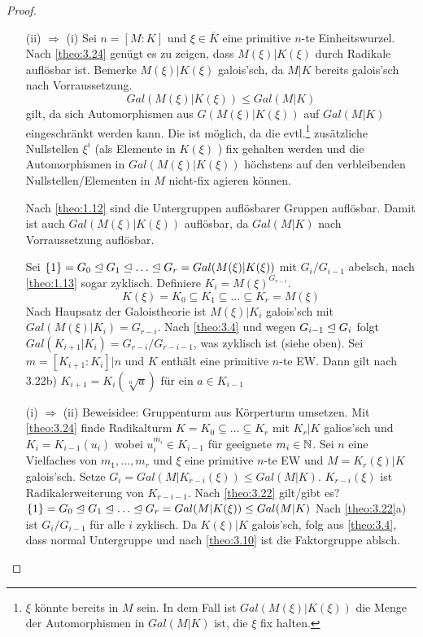\documentclass[../main.tex]{subfiles}
\begin{document}
\begin{proof} $ $
    \begin{itemize}
        \item[(ii) $\Rightarrow$ (i)]
        Sei $n=[M:K]$ und $\xi\in\overline{K}$ eine primitive $n$-te Einheitswurzel.
        Nach \ref{theo:3.24} genügt es zu zeigen, dass $M(\xi)|K(\xi)$ durch Radikale auflösbar ist.
        Bemerke $M(\xi)|K(\xi)$ galois'sch, da $M|K$ bereits galois'sch nach Vorraussetzung.
        $$Gal(M(\xi)|K(\xi)) \leq Gal(M|K)$$
        gilt, da sich Automorphismen aus $G(M(\xi)|K(\xi))$ auf $Gal(M|K)$ eingeschränkt werden kann.
        Die ist möglich, da die evtl.\footnote{$\xi$ könnte bereits in $M$ sein. In dem Fall ist $Gal(M(\xi)|K(\xi))$ die Menge der Automorphismen in $Gal(M|K)$ ist, die $\xi$ fix halten.} zusätzliche Nullstellen $\xi^i$ (als Elemente in $K(\xi)$ ) fix gehalten werden und die Automorphismen in $Gal(M(\xi)|K(\xi))$ höchstens auf den verbleibenden Nullstellen/Elementen in $M$ nicht-fix agieren können.
        
        Nach \cref{theo:1.12} sind die Untergruppen auflösbarer Gruppen auflösbar. Damit ist auch $Gal(M(\xi)|K(\xi))$ auflösbar, da $Gal(M|K)$ nach Vorraussetzung auflösbar.

        Sei $\trivGO = G_0\nteq G_1\nteq \dots\nteq G_r = Gal(M(\xi)|K(\xi))$ mit $G_i/G_{i-1}$ abelsch, nach \ref{theo:1.13} sogar zyklisch.
        Definiere $K_i=M(\xi)^{G_{r-i}}$.
        $$K(\xi) = K_0\subseteq K_1\subseteq \dots\subseteq K_r = M(\xi)$$
        Nach Haupsatz der Galoistheorie ist $M(\xi)|K_i$ galois'sch mit $Gal(M(\xi)|K_i) = G_{r-i}$.
        Nach \ref{theo:3.4} und wegen $G_{i-1}\trianglelefteq G_i$ folgt $Gal(K_{i+1}|K_i) = G_{r-i}/G_{r-i-1}$, was zyklisch ist (siehe oben).
        Sei $m=[K_{i+1}:K_i]|n$ und $K$ enthält eine primitive $n$-te EW.
        Dann gilt nach 3.22b) $K_{i+1}=K_i(\sqrt[n]{a})$ für ein $a\in K_{i-1}$
        \item[(i) $\Rightarrow$ (ii)]
        Beweisidee: Gruppenturm aus Körperturm umsetzen.
        Mit \cref{theo:3.24} finde Radikalturm $K=K_0\subseteq\dots\subseteq K_r$ mit $K_r|K$ galios'sch und $K_i=K_{i-1}(u_i)$ wobei $u_i^{m_i}\in K_{i-1}$ für geeignete $m_i\in \mathbb{N}$.
        Sei $n$ eine Vielfaches von $m_1,\dots,m_r$ und $\xi$ eine primitive $n$-te EW und $M=K_r(\xi)|K$ galois'sch.
        Setze $G_i = Gal(M|K_{r-i}(\xi))\leq Gal(M|K)$.
        $K_{r-i}(\xi)$ ist Radikalerweiterung von $K_{r-i-1}$.
        Nach \ref{theo:3.22} gilt/gibt es? $\trivGO=G_0\nteq G_1\nteq \dots \nteq G_r = Gal(M|K(\xi))\leq Gal(M|K)$
        Nach \ref{theo:3.22}a) ist $G_i/G_{i-1}$ für alle $i$ zyklisch.
        Da $K(\xi)|K$ galois'sch, folg aus \ref{theo:3.4}, dass normal Untergruppe und nach \ref{theo:3.10} ist die Faktorgruppe ablsch.
    \end{itemize}
\end{proof}
\end{document}
